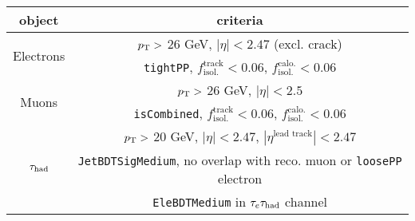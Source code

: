 \begin{tabular}{c|c}
  object   & criteria \\
  \hline\hline
  \multirow{2}{*}{Electrons} & $p_{\mathrm{T}} >$ 26 GeV, $|\eta| < 2.47$ (excl. crack) \\
                             & \texttt{tightPP}, $f_\text{isol.}^\text{track} < 0.06$, $f_\text{isol.}^\text{calo.} < 0.06$ \\
  \hline
  \multirow{2}{*}{Muons}     & $p_{\mathrm{T}} >$ 26 GeV, $|\eta| < 2.5$ \\
                             & \texttt{isCombined}, $f_\text{isol.}^\text{track} < 0.06$, $f_\text{isol.}^\text{calo.} < 0.06$ \\
  \hline
  \multirow{3}{*}{$\tau_\text{had}$}   & $p_{\mathrm{T}} >$ 20 GeV, $|\eta| < 2.47$, $|\eta^\text{lead track}| < 2.47$ \\
                             & \texttt{JetBDTSigMedium}, no overlap with reco. muon or \texttt{loosePP} electron \\
                             & \texttt{EleBDTMedium} in $\tau_e \tau_\text{had}$ channel \\
\end{tabular}
